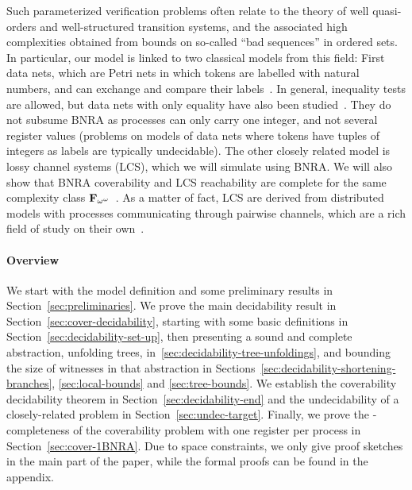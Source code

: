 Such parameterized verification problems often relate to the theory of well quasi-orders and well-structured transition systems, and the associated high complexities obtained from bounds on so-called ``bad sequences'' in ordered sets. In particular, our model is linked to two classical models from this field: First data nets, which are Petri nets in which tokens are labelled with natural numbers, and can exchange and compare their labels~\cite{lazic2007nets}. In general, inequality tests are allowed, but data nets with only equality have also been studied~\cite{ROSAVELARDO201741}. They do not subsume BNRA as processes can only carry one integer, and not several register values (problems on models of data nets where tokens have tuples of integers as labels are typically undecidable).
The other closely related model is lossy channel systems (LCS)\cite{AbdullaJ1996undec}, which we will simulate using BNRA. We will also show that BNRA coverability and LCS reachability are complete for the same complexity class $\mathbf{F}_{\omega^\omega}$~\cite{ChambartS2008ordinal, Schnoebelen2002verifying}.
As a matter of fact, LCS are derived from distributed models with processes communicating through pairwise channels, which are a rich field of study on their own~\cite{Aiswarya2015model,Aiswarya2021network}.

\paragraph*{Overview}


We start with the model definition and some preliminary results in Section~\ref{sec:preliminaries}. We prove the main decidability result in Section~\ref{sec:cover-decidability}, starting with some basic definitions in Section~\ref{sec:decidability-set-up}, then presenting a sound and complete abstraction, unfolding trees, in~\ref{sec:decidability-tree-unfoldings}, and bounding the size of witnesses in that abstraction in Sections~\ref{sec:decidability-shortening-branches}, \ref{sec:local-bounds} and \ref{sec:tree-bounds}. We establish the coverability decidability theorem in Section~\ref{sec:decidability-end} and the undecidability of a closely-related problem in Section~\ref{sec:undec-target}. Finally, we prove the \NP-completeness of the coverability problem with one register per process in Section~\ref{sec:cover-1BNRA}.
Due to space constraints, we only give proof sketches in the main part of the paper, while the formal proofs can be found in the appendix.

